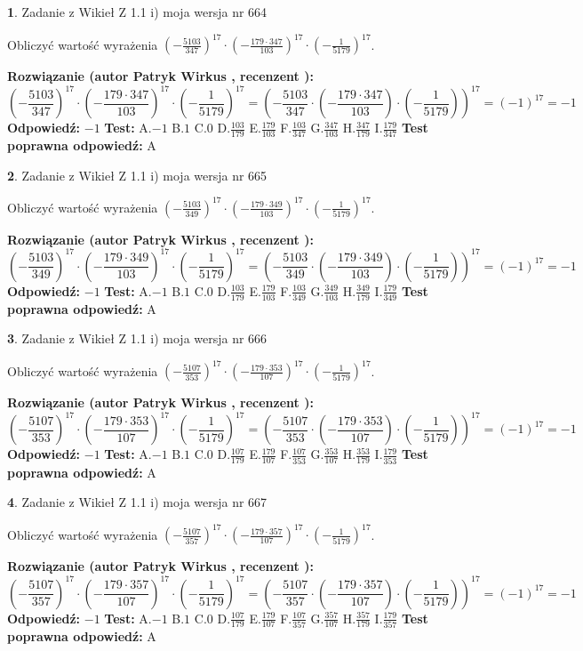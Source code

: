 \documentclass[12pt, a4paper]{article}
\theoremstyle{definition} %
\newtheorem{zad}{}
\newcommand{\zadStart}[1]{\begin{zad}#1\newline}
\newcommand{\zadStop}{\end{zad}}
\newcommand{\rozwStart}[2]{\noindent \textbf{Rozwiązanie (autor #1 , recenzent #2): }\newline}
\newcommand{\rozwStop}{\newline}
\newcommand{\odpStart}{\noindent \textbf{Odpowiedź:}\newline}
\newcommand{\odpStop}{\newline}
\newcommand{\testStart}{\noindent \textbf{Test:}\newline}
\newcommand{\testStop}{\newline}
\newcommand{\kluczStart}{\noindent \textbf{Test poprawna odpowiedź:}\newline}
\newcommand{\kluczStop}{\newline}
\begin{document}
\zadStart{Zadanie z Wikieł Z 1.1 i) moja wersja nr 664}

Obliczyć wartość wyrażenia $(-\frac{5103}{347})^{17} \cdot (-\frac{179 \cdot 347}{103})^{17} \cdot (-\frac{1}{5179})^{17}$.
\zadStop
\rozwStart{Patryk Wirkus}{}
$$(-\frac{5103}{347})^{17} \cdot (-\frac{179 \cdot 347}{103})^{17} \cdot (-\frac{1}{5179})^{17} = (-\frac{5103}{347} \cdot (-\frac{179 \cdot 347}{103}) \cdot (-\frac{1}{5179}))^{17} = (-1)^{17} = -1$$
\rozwStop
\odpStart
$-1$
\odpStop
\testStart
A.$-1$ B.$1$ C.$0$ D.$\frac{103}{179}$ E.$\frac{179}{103}$
F.$\frac{103}{347}$ G.$\frac{347}{103}$
H.$\frac{347}{179}$
I.$\frac{179}{347}$
\testStop
\kluczStart
A
\kluczStop



\zadStart{Zadanie z Wikieł Z 1.1 i) moja wersja nr 665}

Obliczyć wartość wyrażenia $(-\frac{5103}{349})^{17} \cdot (-\frac{179 \cdot 349}{103})^{17} \cdot (-\frac{1}{5179})^{17}$.
\zadStop
\rozwStart{Patryk Wirkus}{}
$$(-\frac{5103}{349})^{17} \cdot (-\frac{179 \cdot 349}{103})^{17} \cdot (-\frac{1}{5179})^{17} = (-\frac{5103}{349} \cdot (-\frac{179 \cdot 349}{103}) \cdot (-\frac{1}{5179}))^{17} = (-1)^{17} = -1$$
\rozwStop
\odpStart
$-1$
\odpStop
\testStart
A.$-1$ B.$1$ C.$0$ D.$\frac{103}{179}$ E.$\frac{179}{103}$
F.$\frac{103}{349}$ G.$\frac{349}{103}$
H.$\frac{349}{179}$
I.$\frac{179}{349}$
\testStop
\kluczStart
A
\kluczStop



\zadStart{Zadanie z Wikieł Z 1.1 i) moja wersja nr 666}

Obliczyć wartość wyrażenia $(-\frac{5107}{353})^{17} \cdot (-\frac{179 \cdot 353}{107})^{17} \cdot (-\frac{1}{5179})^{17}$.
\zadStop
\rozwStart{Patryk Wirkus}{}
$$(-\frac{5107}{353})^{17} \cdot (-\frac{179 \cdot 353}{107})^{17} \cdot (-\frac{1}{5179})^{17} = (-\frac{5107}{353} \cdot (-\frac{179 \cdot 353}{107}) \cdot (-\frac{1}{5179}))^{17} = (-1)^{17} = -1$$
\rozwStop
\odpStart
$-1$
\odpStop
\testStart
A.$-1$ B.$1$ C.$0$ D.$\frac{107}{179}$ E.$\frac{179}{107}$
F.$\frac{107}{353}$ G.$\frac{353}{107}$
H.$\frac{353}{179}$
I.$\frac{179}{353}$
\testStop
\kluczStart
A
\kluczStop



\zadStart{Zadanie z Wikieł Z 1.1 i) moja wersja nr 667}

Obliczyć wartość wyrażenia $(-\frac{5107}{357})^{17} \cdot (-\frac{179 \cdot 357}{107})^{17} \cdot (-\frac{1}{5179})^{17}$.
\zadStop
\rozwStart{Patryk Wirkus}{}
$$(-\frac{5107}{357})^{17} \cdot (-\frac{179 \cdot 357}{107})^{17} \cdot (-\frac{1}{5179})^{17} = (-\frac{5107}{357} \cdot (-\frac{179 \cdot 357}{107}) \cdot (-\frac{1}{5179}))^{17} = (-1)^{17} = -1$$
\rozwStop
\odpStart
$-1$
\odpStop
\testStart
A.$-1$ B.$1$ C.$0$ D.$\frac{107}{179}$ E.$\frac{179}{107}$
F.$\frac{107}{357}$ G.$\frac{357}{107}$
H.$\frac{357}{179}$
I.$\frac{179}{357}$
\testStop
\kluczStart
A
\kluczStop
\end{document}
